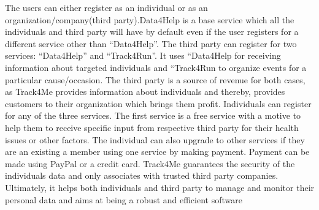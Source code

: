 \qquad The users can either register as an individual or as an organization/company(third party).Data4Help is a base service which all the individuals and third party will have by default even if the user registers for a different service other than “Data4Help”. The third party can register for two services: “Data4Help” and “Track4Run”. It uses “Data4Help for receiving information about targeted individuals and “Track4Run to organize events for a particular cause/occasion. The third party is a source of revenue for both cases, as Track4Me provides information about individuals and thereby,  provides customers to their organization which brings them profit. Individuals can register for any of the three services. The first service is a free service  with a motive to help them to receive specific input from respective third party for their health issues or other factors. The individual can also upgrade to other services if they are an existing a member using one service by making payment. Payment can be made using PayPal or a credit card. Track4Me guarantees the security of the individuals data and only associates with trusted third party companies. Ultimately, it helps both individuals and third party to manage and monitor their personal data and aims at being a robust and efficient software
